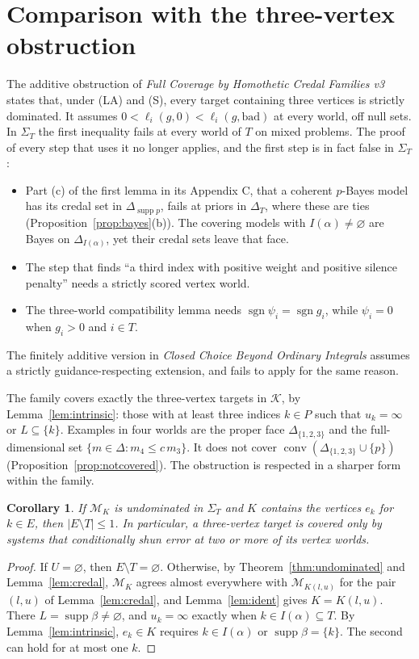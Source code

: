 \documentclass[11pt]{article}
\newtheorem{corollary}[theorem]{Corollary}
\theoremstyle{remark}\newtheorem{remark}[theorem]{Remark}
\newcommand{\M}{\mathcal M}
\newcommand{\K}{\mathcal K}
\newcommand{\supp}{\operatorname{supp}}
\newcommand{\conv}{\operatorname{conv}}
\begin{document}
\section{Comparison with the three-vertex obstruction}

The additive obstruction of \emph{Full Coverage by Homothetic Credal
Families v3} states that, under (LA) and (S), every target containing
three vertices is strictly dominated. It assumes
$0<\ell_i(g,0)<\ell_i(g,\text{bad})$ at every world, off null sets. In
$\Sigma_T$ the first inequality fails at every world of $T$ on mixed
problems. The proof of every step that uses it no longer applies, and the
first step is in fact false in $\Sigma_T$:
\begin{itemize}[leftmargin=*,itemsep=2pt]
\item Part (c) of the first lemma in its Appendix C, that a coherent
$p$-Bayes model has its credal set in $\Delta_{\supp p}$, fails at priors in $\Delta_T$, where these are
ties (Proposition~\ref{prop:bayes}(b)). The covering models with
$I(\alpha)\ne\varnothing$ are Bayes on $\Delta_{I(\alpha)}$, yet their
credal sets leave that face.
\item The step that finds ``a third index with positive weight and positive
silence penalty'' needs a strictly scored vertex world.
\item The three-world compatibility lemma needs $\operatorname{sgn}
\psi_i=\operatorname{sgn}g_i$, while $\psi_i=0$ when $g_i>0$ and $i\in T$.
\end{itemize}
The finitely additive version in \emph{Closed Choice Beyond Ordinary
Integrals} assumes a strictly guidance-respecting extension, and fails to
apply for the same reason.

The family covers exactly the three-vertex targets in $\K$, by
Lemma~\ref{lem:intrinsic}: those with at least three indices $k\in P$
such that $u_k=\infty$ or $L\subseteq\{k\}$. Examples in four worlds are the proper face
$\Delta_{\{1,2,3\}}$ and the full-dimensional set
$\{m\in\Delta:m_4\le c\,m_3\}$. It does not cover
$\conv(\Delta_{\{1,2,3\}}\cup\{p\})$ (Proposition~\ref{prop:notcovered}).
The obstruction is respected in a sharper form within the family.

\begin{corollary}\label{cor:vertices}
If $\M_K$ is undominated in $\Sigma_T$ and $K$ contains the vertices $e_k$
for $k\in E$, then $|E\setminus T|\le1$. In particular, a three-vertex
target is covered only by systems that conditionally shun error at two or
more of its vertex worlds.
\end{corollary}
\begin{proof}
If $U=\varnothing$, then $E\setminus T=\varnothing$. Otherwise, by
Theorem~\ref{thm:undominated} and Lemma~\ref{lem:credal}, $\M_K$ agrees
almost everywhere with $\M_{K(l,u)}$ for the pair $(l,u)$ of
Lemma~\ref{lem:credal}, and Lemma~\ref{lem:ident} gives $K=K(l,u)$. There
$L=\supp\beta\ne\varnothing$, and $u_k=\infty$ exactly when
$k\in I(\alpha)\subseteq T$. By Lemma~\ref{lem:intrinsic}, $e_k\in K$
requires $k\in I(\alpha)$ or $\supp\beta=\{k\}$. The second can hold for at
most one $k$.
\end{proof}
\end{document}
